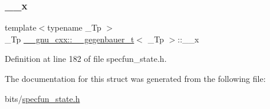 \subsubsection{\texorpdfstring{\+\_\+\+\_\+x}{\_\_x}}
{\footnotesize\ttfamily template$<$typename \+\_\+\+Tp $>$ \\
\+\_\+\+Tp \hyperlink{struct____gnu__cxx_1_1____gegenbauer__t}{\+\_\+\+\_\+gnu\+\_\+cxx\+::\+\_\+\+\_\+gegenbauer\+\_\+t}$<$ \+\_\+\+Tp $>$\+::\+\_\+\+\_\+x}



Definition at line 182 of file specfun\+\_\+state.\+h.



The documentation for this struct was generated from the following file\+:\begin{DoxyCompactItemize}
\item 
bits/\hyperlink{specfun__state_8h}{specfun\+\_\+state.\+h}\end{DoxyCompactItemize}
